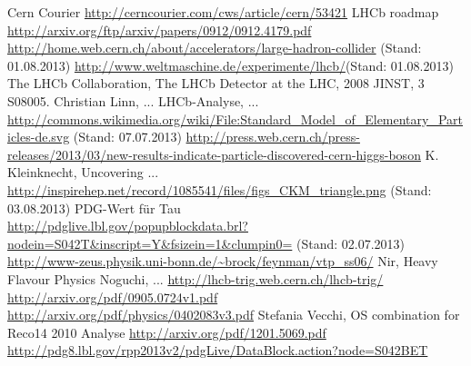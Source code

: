 \documentclass[ a4paper,
                12pt, 
                twoside, 
                chapterprefix,                
              ]{scrreprt}
\begin{document}

\tableofcontents









\begin{thebibliography}{---}
 Cern Courier \url{http://cerncourier.com/cws/article/cern/53421}
 LHCb roadmap \url{http://arxiv.org/ftp/arxiv/papers/0912/0912.4179.pdf}
 \url{http://home.web.cern.ch/about/accelerators/large-hadron-collider} (Stand: 01.08.2013)
 \url{http://www.weltmaschine.de/experimente/lhcb/}(Stand: 01.08.2013)
 The LHCb Collaboration, The LHCb Detector at the LHC, 2008 JINST, 3 S08005.
 Christian Linn, ...
 LHCb-Analyse, ...
 \url{http://commons.wikimedia.org/wiki/File:Standard_Model_of_Elementary_Particles-de.svg} (Stand: 07.07.2013)
 \url{http://press.web.cern.ch/press-releases/2013/03/new-results-indicate-particle-discovered-cern-higgs-boson}
  K. Kleinknecht, Uncovering ...
 \url{http://inspirehep.net/record/1085541/files/figs_CKM_triangle.png} (Stand: 03.08.2013)
 PDG-Wert für Tau \\ \url{http://pdglive.lbl.gov/popupblockdata.brl?nodein=S042T&inscript=Y&fsizein=1&clumpin0=} (Stand: 02.07.2013)
 \url{http://www-zeus.physik.uni-bonn.de/~brock/feynman/vtp_ss06/}
 Nir, Heavy Flavour Physics
 Noguchi, ...
 \url{http://lhcb-trig.web.cern.ch/lhcb-trig/}
 \url{http://arxiv.org/pdf/0905.0724v1.pdf}
 \url{http://arxiv.org/pdf/physics/0402083v3.pdf}
 Stefania Vecchi, OS combination for Reco14
 2010 Analyse
 \url{http://arxiv.org/pdf/1201.5069.pdf}
 \url{http://pdg8.lbl.gov/rpp2013v2/pdgLive/DataBlock.action?node=S042BET}
\end{thebibliography}


\end{document}
